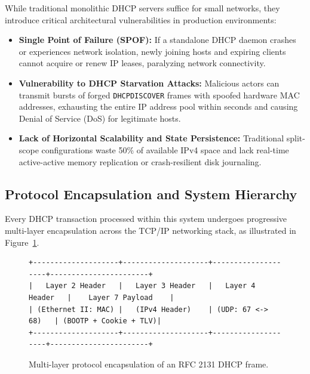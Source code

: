 \documentclass[11pt,a4paper]{article}
\begin{document}
While traditional monolithic DHCP servers suffice for small networks, they introduce critical architectural vulnerabilities in production environments:
\begin{itemize}[leftmargin=2em]
    \item \textbf{Single Point of Failure (SPOF):} If a standalone DHCP daemon crashes or experiences network isolation, newly joining hosts and expiring clients cannot acquire or renew IP leases, paralyzing network connectivity.
    \item \textbf{Vulnerability to DHCP Starvation Attacks:} Malicious actors can transmit bursts of forged \texttt{DHCPDISCOVER} frames with spoofed hardware MAC addresses, exhausting the entire IP address pool within seconds and causing Denial of Service (DoS) for legitimate hosts.
    \item \textbf{Lack of Horizontal Scalability and State Persistence:} Traditional split-scope configurations waste 50\% of available IPv4 space and lack real-time active-active memory replication or crash-resilient disk journaling.
\end{itemize}

\subsection{Protocol Encapsulation and System Hierarchy}
Every DHCP transaction processed within this system undergoes progressive multi-layer encapsulation across the TCP/IP networking stack, as illustrated in Figure~\ref{fig:encapsulation}.

\begin{figure}[H]
\centering
\begin{lstlisting}[numbers=none, frame=none, backgroundcolor=\color{white}, basicstyle=\ttfamily\footnotesize]
+--------------------+--------------------+--------------------+-----------------------+
|   Layer 2 Header   |   Layer 3 Header   |   Layer 4 Header   |    Layer 7 Payload    |
| (Ethernet II: MAC) |   (IPv4 Header)    | (UDP: 67 <-> 68)   | (BOOTP + Cookie + TLV)|
+--------------------+--------------------+--------------------+-----------------------+
\end{lstlisting}
\caption{Multi-layer protocol encapsulation of an RFC 2131 DHCP frame.}
\label{fig:encapsulation}
\end{figure}
\end{document}
